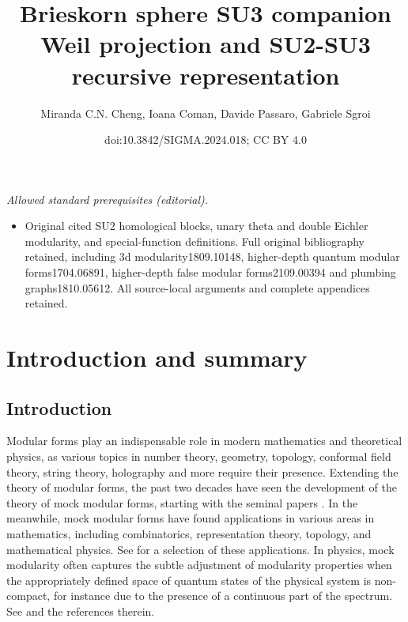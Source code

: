 \documentclass[10pt,a4paper]{amsart}
\title{Brieskorn sphere SU3 companion Weil projection and SU2-SU3 recursive representation}
\author{Miranda C.N. Cheng, Ioana Coman, Davide Passaro, Gabriele Sgroi}
\date{doi:10.3842/SIGMA.2024.018; CC BY 4.0}
\theoremstyle{definition}
\numberwithin{equation}{section}
\begin{document}
\maketitle
\noindent\textit{Allowed standard prerequisites (editorial).}\begin{itemize}
\item Original cited SU2 homological blocks, unary theta and double Eichler modularity, and special-function definitions. Full original bibliography retained, including 3d modularity1809.10148, higher-depth quantum modular forms1704.06891, higher-depth false modular forms2109.00394 and plumbing graphs1810.05612. All source-local arguments and complete appendices retained.
\end{itemize}\medskip
\section{Introduction and summary}
\label{sec:intro_sum}
\subsection{Introduction}

Modular forms play an indispensable role in modern mathematics and theoretical physics, as various topics in number theory, geometry, topology, conformal field theory, string theory, holography and more require their presence. Extending the theory of modular forms, the past two decades have seen the development of the theory of mock modular forms, starting with the seminal papers \cite{ BringmannOno,2002math12286H, ZagierBourbaki,zwegers2008mock}. In the meanwhile, mock modular forms have found applications in various areas in mathematics, including combinatorics, representation theory, topology, and mathematical physics. See \cite{Bringmann2017HarmonicMF} for a selection of these applications. In physics, mock modularity often captures the subtle adjustment of modularity properties when the appropriately defined space of quantum states of the physical system is non-compact, for instance due to the presence of a continuous part of the spectrum. See \cite{Dabholkar:2021lzt} and the references therein.
\end{document}
